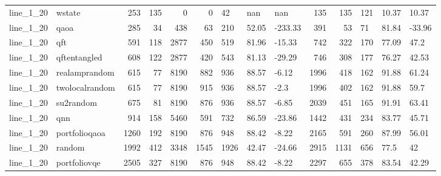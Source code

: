 \begin{longtable}{llrrrrlllrrlll}
line\_1\_20 & wstate & 253 & 135 & 0 & 0 & 42 & nan & nan & 135 & 135 & 121 & 10.37 & 10.37 \\
line\_1\_20 & qaoa & 285 & 34 & 438 & 63 & 210 & 52.05 & -233.33 & 391 & 53 & 71 & 81.84 & -33.96 \\
line\_1\_20 & qft & 591 & 118 & 2877 & 450 & 519 & 81.96 & -15.33 & 742 & 322 & 170 & 77.09 & 47.2 \\
line\_1\_20 & qftentangled & 608 & 122 & 2877 & 420 & 543 & 81.13 & -29.29 & 746 & 308 & 177 & 76.27 & 42.53 \\
line\_1\_20 & realamprandom & 615 & 77 & 8190 & 882 & 936 & 88.57 & -6.12 & 1996 & 418 & 162 & 91.88 & 61.24 \\
line\_1\_20 & twolocalrandom & 615 & 77 & 8190 & 915 & 936 & 88.57 & -2.3 & 1996 & 402 & 162 & 91.88 & 59.7 \\
line\_1\_20 & su2random & 675 & 81 & 8190 & 876 & 936 & 88.57 & -6.85 & 2039 & 451 & 165 & 91.91 & 63.41 \\
line\_1\_20 & qnn & 914 & 158 & 5460 & 591 & 732 & 86.59 & -23.86 & 1442 & 431 & 234 & 83.77 & 45.71 \\
line\_1\_20 & portfolioqaoa & 1260 & 192 & 8190 & 876 & 948 & 88.42 & -8.22 & 2165 & 591 & 260 & 87.99 & 56.01 \\
line\_1\_20 & random & 1992 & 412 & 3348 & 1545 & 1926 & 42.47 & -24.66 & 2915 & 1131 & 656 & 77.5 & 42 \\
line\_1\_20 & portfoliovqe & 2505 & 327 & 8190 & 876 & 948 & 88.42 & -8.22 & 2297 & 655 & 378 & 83.54 & 42.29 \\
\end{longtable}
